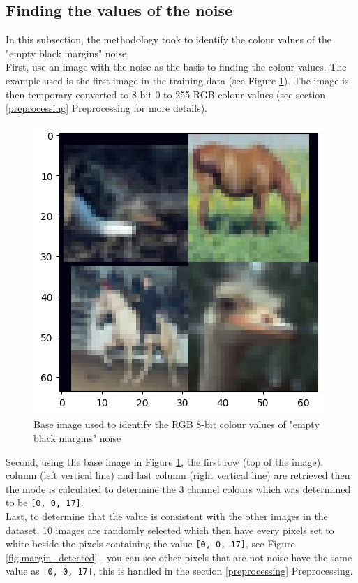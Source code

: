 \documentclass{article}
\begin{document}
\subsection{Finding the values of the noise}

In this subsection, the methodology took to identify the colour values of the
"empty black margins" noise.\\

First, use an image with the noise as the basis to finding the colour values. The
example used is the first image in the training data (see Figure 
\ref{fig:example_image_margins}). The image is then temporary 
converted to 8-bit 0 to 255 RGB colour values (see section 
\ref{preprocessing} Preprocessing for more details).

\begin{figure}[H]
    \centering
    \includegraphics[width=0.7\linewidth]{images/example_image_margins.png}
    \caption{Base image used to identify the RGB 8-bit colour values of "empty black margins" noise}
    \label{fig:example_image_margins}
\end{figure}


Second, using the base image in Figure \ref{fig:example_image_margins}, the 
first row (top of the image), column (left vertical line) and last column (right vertical line) are retrieved then the mode is calculated to determine
the 3 channel colours which was determined to be \texttt{[0, 0, 17]}.\\

Last, to determine that the value is consistent with the other images in the dataset, 10 
images are randomly selected which then have every pixels set to white beside the pixels
containing the value \texttt{[0, 0, 17]}, see Figure \ref{fig:margin_detected} - you can see 
other pixels that are not noise have the same value as \texttt{[0, 0, 17]}, this is handled
in the section \ref{preprocessing} Preprocessing.
\end{document}
